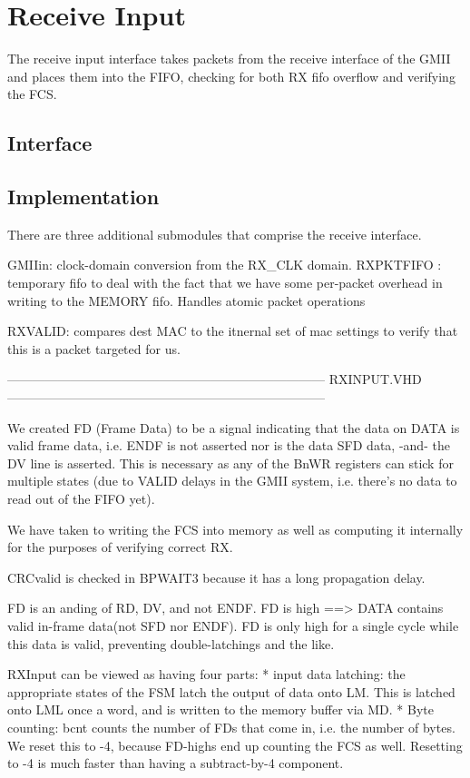 \section{Receive Input}

The receive input interface takes packets from the receive interface of the GMII and places them into the FIFO, checking for both RX fifo overflow and verifying the FCS. 

\subsection{Interface}

\subsection{Implementation}

There are three additional submodules that comprise the receive interface. 

GMIIin: clock-domain conversion from the RX_CLK domain. 
RXPKTFIFO : temporary fifo to deal with the fact that we have some per-packet overhead in writing to the MEMORY fifo. Handles atomic packet operations

RXVALID: compares dest MAC to the itnernal set of mac settings to verify that this is a packet targeted for us. 


---------------------------------------------------------------------------
RXINPUT.VHD
---------------------------------------------------------------------------

We created FD (Frame Data) to be a signal indicating that the data on DATA is valid frame data, i.e. ENDF is not asserted nor is the data SFD data, -and- the DV line is asserted. This is necessary as any of the BnWR registers can stick for multiple states (due to VALID delays in the GMII system, i.e. there's no data to read out of the FIFO yet). 

We have taken to writing the FCS into memory as well as computing it
internally for the purposes of verifying correct RX. 

CRCvalid is checked in BPWAIT3 because it has a long propagation delay. 

FD is an anding of RD, DV, and not ENDF. FD is high ==> DATA contains valid in-frame data(not SFD nor ENDF). FD is only high for a single cycle while this data is valid, preventing double-latchings and the like. 

RXInput can be viewed as having four parts:
   * input data latching: the appropriate states of the FSM latch the output of data onto LM. This is latched onto LML once a word, and is written to the memory buffer via MD. 
   * Byte counting: bcnt counts the number of FDs that come in, i.e. the number of bytes. We reset this to -4, because FD-highs end up counting the FCS as well. Resetting to -4 is much faster than having a subtract-by-4 component. 


